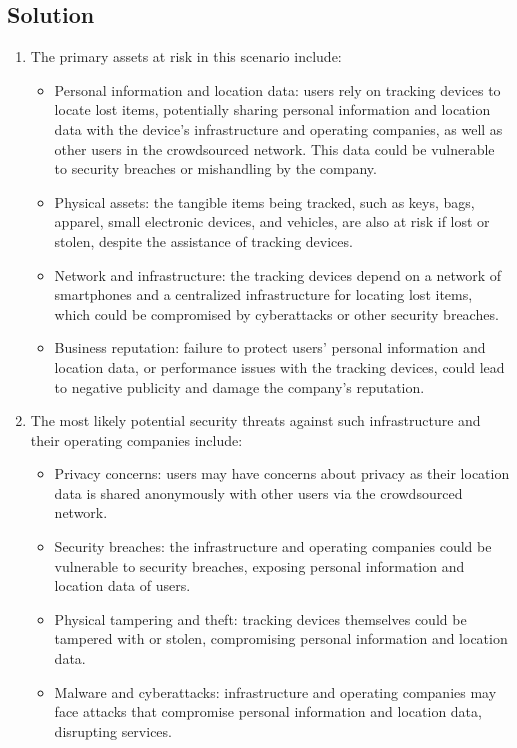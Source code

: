 \subsection{Solution}
\begin{enumerate}
    \item The primary assets at risk in this scenario include:
        \begin{itemize}
            \item Personal information and location data: users rely on tracking devices to locate lost items, potentially sharing personal information and location data with the device's infrastructure and operating companies, as well as other users in the crowdsourced network. 
                This data could be vulnerable to security breaches or mishandling by the company.
            \item Physical assets: the tangible items being tracked, such as keys, bags, apparel, small electronic devices, and vehicles, are also at risk if lost or stolen, despite the assistance of tracking devices.
            \item Network and infrastructure: the tracking devices depend on a network of smartphones and a centralized infrastructure for locating lost items, which could be compromised by cyberattacks or other security breaches.
            \item Business reputation: failure to protect users' personal information and location data, or performance issues with the tracking devices, could lead to negative publicity and damage the company's reputation.
        \end{itemize}
    \item The most likely potential security threats against such infrastructure and their operating companies include:
        \begin{itemize}
            \item Privacy concerns: users may have concerns about privacy as their location data is shared anonymously with other users via the crowdsourced network.
            \item Security breaches: the infrastructure and operating companies could be vulnerable to security breaches, exposing personal information and location data of users.
            \item Physical tampering and theft: tracking devices themselves could be tampered with or stolen, compromising personal information and location data.
            \item Malware and cyberattacks: infrastructure and operating companies may face attacks that compromise personal information and location data, disrupting services.

\end{itemize}
\end{enumerate}
